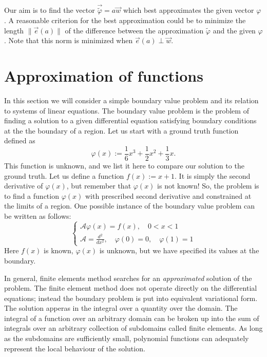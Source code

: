 \documentclass[notitlepage,oneside]{book}
\begin{document}
Our aim is to find the vector $\vec{\tilde{\varphi}} = a\vec{w}$ which best approximates the given vector $\varphi$.
A reasonable criterion for the best approximation could be to minimize the length $\|\vec{e}(a)\|$ of the difference between the approximation $\tilde\varphi$ and the given $\varphi$.
Note that this norm is minimized when $\vec{e}(a) \perp \vec{w}$.

\section{Approximation of functions}
\label{sec:equadiff}

In this section we will consider a simple boundary value problem and its relation to systems of linear equations.
The boundary value problem is the problem of finding a solution to a given differential equation satisfying boundary conditions at the the boundary of a region.
Let us start with a ground truth function defined as 
$$
\varphi(x) := \frac{1}{6} x^3 + \frac{1}{2} x^2 + \frac{1}{3} x.
$$
This function is unknown, and we list it here to compare our solution to the ground truth.
Let us define a function $f(x) := x+1$.
It is simply the second derivative of $\varphi(x)$, but remember that $\varphi(x)$ is not known!
So, the problem is to find a function $\varphi(x)$ with prescribed second derivative and constrained at the limits of a region.
One possible instance of the boundary value problem can be written as follows:
\begin{equation}
\label{eq:femproblem}
\left\{
\begin{split}
\mathcal A\varphi(x) = f(x), \quad 0 < x < 1\\
\mathcal A=\frac{d^2}{dx^2}, \quad \varphi(0)=0, \quad \varphi(1)=1
\end{split}
\right.
\end{equation}
Here $f(x)$ is known, $\varphi(x)$ is unknown, but we have specified its values at the boundary.

In general, finite elements method searches for an \textit{approximated} solution of the problem.
The finite element method does not operate directly on the differential equations; instead the boundary problem is put into equivalent variational form.
The solution apperas in the integral over a quantity over the domain. The integral of a function over an arbitrary domain can be broken up into the sum of integrals over an arbitrary collection 
of subdomains called finite elements. As long as the subdomains are sufficiently small, polynomial functions can adequately represent the local behaviour of the solution.
\end{document}
